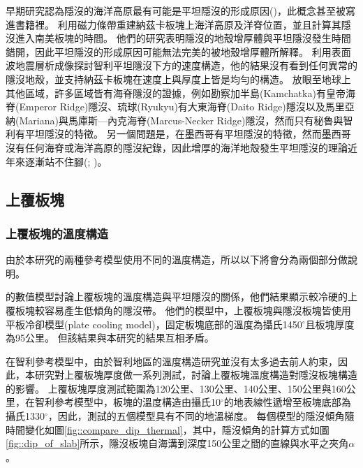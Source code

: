 早期研究認為隱沒的海洋高原最有可能是平坦隱沒的形成原因(\citealp{gutscher2002andean})，此概念甚至被寫進書籍裡。
\citealp{Skinner2013}利用磁力條帶重建納茲卡板塊上海洋高原及洋脊位置，並且計算其隱沒進入南美板塊的時間。
他們的研究表明隱沒的地殼增厚體與平坦隱沒發生時間錯開，因此平坦隱沒的形成原因可能無法完美的被地殼增厚體所解釋。
\citealp{Marot2014}利用表面波地震層析成像探討智利平坦隱沒下方的速度構造，他的結果沒有看到任何異常的隱沒地殼，並支持納茲卡板塊在速度上與厚度上皆是均勻的構造。
放眼至地球上其他區域，許多區域皆有海脊隱沒的證據，例如勘察加半島(Kamchatka)有皇帝海脊(Emperor Ridge)隱沒、琉球(Ryukyu)有大東海脊(Daito Ridge)隱沒以及馬里亞納(Mariana)與馬庫斯—內克海脊(Marcus-Necker Ridge)隱沒，然而只有秘魯與智利有平坦隱沒的特徵。
另一個問題是，在墨西哥有平坦隱沒的特徵，然而墨西哥沒有任何海脊或海洋高原的隱沒紀錄，因此增厚的海洋地殼發生平坦隱沒的理論近年來逐漸站不住腳(\citealp{schellart2020control}; \citealp{Schellart2021})。



\subsection{上覆板塊}
\subsubsection{上覆板塊的溫度構造}
由於本研究的兩種參考模型使用不同的溫度構造，所以以下將會分為兩個部分做說明。

\citealp{Thermal2012}的數值模型討論上覆板塊的溫度構造與平坦隱沒的關係，他們結果顯示較冷硬的上覆板塊較容易產生低傾角的隱沒帶。
他們的模型中，上覆板塊與隱沒板塊皆使用平板冷卻模型(plate cooling model)，固定板塊底部的溫度為攝氏1450$^\circ$且板塊厚度為95公里。
但該結果與本研究的結果互相矛盾。

在智利參考模型中，由於智利地區的溫度構造研究並沒有太多過去前人約束，因此，本研究對上覆板塊厚度做一系列測試，討論上覆板塊溫度構造對隱沒板塊構造的影響。
上覆板塊厚度測試範圍為120公里、130公里、140公里、150公里與160公里，在智利參考模型中，板塊的溫度構造由攝氏10$^\circ$的地表線性遞增至板塊底部為攝氏1330$^\circ$，因此，測試的五個模型具有不同的地溫梯度。
每個模型的隱沒傾角隨時間變化如圖\ref{fig::compare_dip_thermal}，其中，隱沒傾角的計算方式如圖\ref{fig::dip_of_slab}所示，隱沒板塊自海溝到深度150公里之間的直線與水平之夾角$\alpha$。

